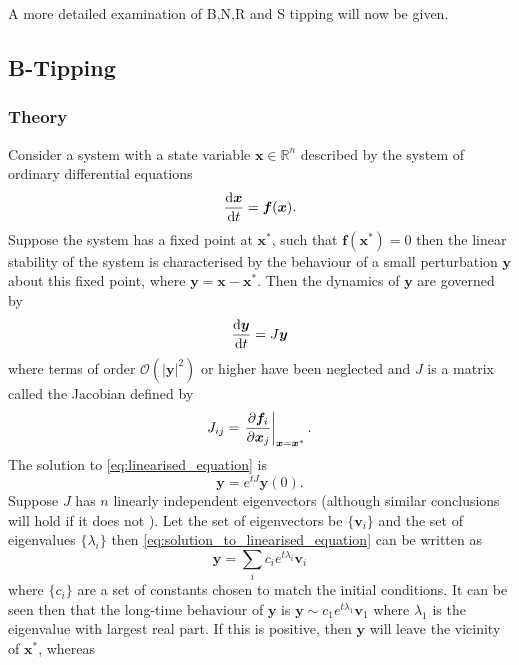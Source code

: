 A more detailed examination of B,N,R and S tipping will now be given.

\subsection{B-Tipping}
\label{sec:btipping}
\subsubsection{Theory}
Consider a system with a state variable $\bm{x} \in \mathbb{R}^n$ described by the system of ordinary  differential equations
\begin{equation}
  \label{eq:generic_system}
  \dv{\bm{x}}{t} = \bm{f}(\bm{x}).
\end{equation}
Suppose the system has a fixed point at $\bm{x}^*$, such that $\bm{f}(\bm{x}^*)=0$ then the linear stability of the system \parencite{Strogatz2015} is characterised by
the behaviour of a small perturbation $\bm{y}$ about this fixed point, where $\bm{y} = \bm{x} - \bm{x}^*$. Then the dynamics of $\bm{y}$ are governed by
\begin{equation}
  \label{eq:linearised_equation}
  \dv{\bm{y}}{t} = J\bm{y} 
\end{equation}
where terms of order $\mathcal{O}\left(\left|\bm{y}\right|^2\right)$ or higher have been neglected and $J$ is a matrix called the Jacobian defined by
\begin{equation}
  \label{eq:jacobian}
  J_{ij} = \eval{\pdv{\bm{f}_i}{\bm{x}_j}}_{\bm{x}=\bm{x}^*}.
\end{equation}
The solution to \cref{eq:linearised_equation} is
\begin{equation}
  \label{eq:solution_to_linearised_equation}
  \bm{y} = e^{tJ}\bm{y}(0).
\end{equation}
Suppose $J$ has $n$ linearly independent eigenvectors (although similar conclusions will hold if it does not \parencite{guckenheimer2013}).
Let the set of eigenvectors be $\{\bm{v}_i\}$ and the set of eigenvalues $\{\lambda_i\}$ then \cref{eq:solution_to_linearised_equation} can be written as
\begin{equation}
  \label{eq:solution_to_linearised_equation_eigen}
  \bm{y} = \sum_i c_i e^{t\lambda_i}\bm{v}_i
\end{equation}
where $\{c_i\}$ are a set of constants chosen to match the initial conditions. It can be seen then that the long-time behaviour of $\bm{y}$ is
$\bm{y} \sim c_1 e^{t\lambda_1} \bm{v}_1$ where $\lambda_1$ is the eigenvalue with largest real part. If this is positive, then $\bm{y}$ will leave the vicinity of $\bm{x}^*$, whereas
